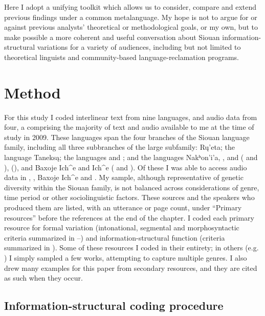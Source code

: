 \documentclass[output=paper]{LSP/langsci}
\begin{document}
	Here I adopt a unifying toolkit which allows us to consider, compare and extend previous findings under a common metalanguage. My hope is not to argue for or against previous analysts’ theoretical or methodological goals, or my own, but to make possible a more coherent and useful conversation about Siouan information-structural variations for a variety of audiences, including but not limited to theoretical linguists and community-based language-reclamation programs.

\section{Method}

For this study I coded interlinear text from nine languages, and audio data from four, a  comprising the majority of text and audio available to me at the time of study in 2009. These languages span the four branches of the Siouan language family, including all three subbranches of the large  subfamily: Rų’eta; the  language Taneksą; the  languages  and ; and the  languages Nakʰon’i’a, ,  and  ( and ),  (), and Baxoje Ich\^{}e and  Ich\^{}e ( and ). Of these I was able to access audio data in , , Baxoje Ich\^{}e and . My sample, although representative of genetic diversity within the Siouan family, is not balanced across considerations of genre, time period or other sociolinguistic factors. These sources and the speakers who produced them are listed, with an utterance or page count, under “Primary resources” before the references at the end of the chapter. I coded each primary resource for formal variation (intonational, segmental and morphosyntactic criteria summarized in --) and information-structural function (criteria summarized in ). Some of these resources I coded in their entirety; in others (e.g. \citealt{Dorsey1890}) I simply sampled a few works, attempting to capture multiple genres. I also drew many examples for this paper from secondary resources, and they are cited as such when they occur.

\subsection{Information-structural coding procedure}\label{informationcoding}
\end{document}

